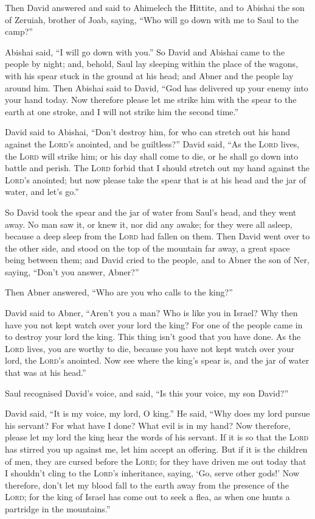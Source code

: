  Then David answered and said to Ahimelech the Hittite,
and to Abishai the son of Zeruiah, brother of Joab, saying, ``Who will
go down with me to Saul to the camp?''

Abishai said, ``I will go down with you.''  So David and
Abishai came to the people by night; and, behold, Saul lay sleeping
within the place of the wagons, with his spear stuck in the ground at
his head; and Abner and the people lay around him.  Then
Abishai said to David, ``God has delivered up your enemy into your hand
today. Now therefore please let me strike him with the spear to the
earth at one stroke, and I will not strike him the second time.''

 David said to Abishai, ``Don't destroy him, for who can
stretch out his hand against the \textsc{Lord}'s anointed, and be
guiltless?''  David said, ``As the \textsc{Lord} lives,
the \textsc{Lord} will strike him; or his day shall come to die, or he
shall go down into battle and perish.  The \textsc{Lord}
forbid that I should stretch out my hand against the \textsc{Lord}'s
anointed; but now please take the spear that is at his head and the jar
of water, and let's go.''

 So David took the spear and the jar of water from Saul's
head, and they went away. No man saw it, or knew it, nor did any awake;
for they were all asleep, because a deep sleep from the \textsc{Lord}
had fallen on them.  Then David went over to the other
side, and stood on the top of the mountain far away, a great space being
between them;  and David cried to the people, and to
Abner the son of Ner, saying, ``Don't you answer, Abner?''

Then Abner answered, ``Who are you who calls to the king?''

 David said to Abner, ``Aren't you a man? Who is like you
in Israel? Why then have you not kept watch over your lord the king? For
one of the people came in to destroy your lord the king. 
This thing isn't good that you have done. As the \textsc{Lord} lives,
you are worthy to die, because you have not kept watch over your lord,
the \textsc{Lord}'s anointed. Now see where the king's spear is, and the
jar of water that was at his head.''

 Saul recognised David's voice, and said, ``Is this your
voice, my son David?''

David said, ``It is my voice, my lord, O king.''  He
said, ``Why does my lord pursue his servant? For what have I done? What
evil is in my hand?  Now therefore, please let my lord
the king hear the words of his servant. If it is so that the
\textsc{Lord} has stirred you up against me, let him accept an offering.
But if it is the children of men, they are cursed before the
\textsc{Lord}; for they have driven me out today that I shouldn't cling
to the \textsc{Lord}'s inheritance, saying, `Go, serve other gods!'
 Now therefore, don't let my blood fall to the earth away
from the presence of the \textsc{Lord}; for the king of Israel has come
out to seek a flea, as when one hunts a partridge in the mountains.''

